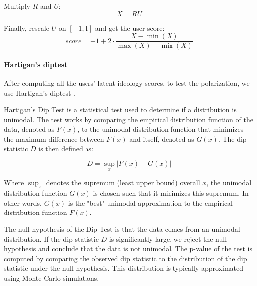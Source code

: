 Multiply $R$ and $U$:
\begin{equation}
X = R U
\end{equation}

Finally, rescale $U$ on $[-1,1]$ and get the user score:
\begin{equation}
score = -1 + 2 \cdot \frac{{X} - \min(X)}{\max(X) - \min(X)}
\end{equation}








\paragraph{Hartigan's diptest}

After computing all the users' latent ideology scores, to test the polarization, we use Hartigan's diptest \cite{hartigan_dip_1985}.

Hartigan's Dip Test is a statistical test used to determine if a distribution is unimodal. The test works by comparing the empirical distribution function of the data, denoted as $F(x)$, to the unimodal distribution function that minimizes the maximum difference between $F(x)$ and itself, denoted as $G(x)$. The dip statistic $D$ is then defined as:

\begin{equation}
D = \sup_x |F(x) - G(x)|
\end{equation}

Where $\sup_x$ denotes the supremum (least upper bound) overall $x$, the unimodal distribution function $G(x)$ is chosen such that it minimizes this supremum. In other words, $G(x)$ is the "best" unimodal approximation to the empirical distribution function $F(x)$.

The null hypothesis of the Dip Test is that the data comes from an unimodal distribution. If the dip statistic $D$ is significantly large, we reject the null hypothesis and conclude that the data is not unimodal. The p-value of the test is computed by comparing the observed dip statistic to the distribution of the dip statistic under the null hypothesis. This distribution is typically approximated using Monte Carlo simulations.